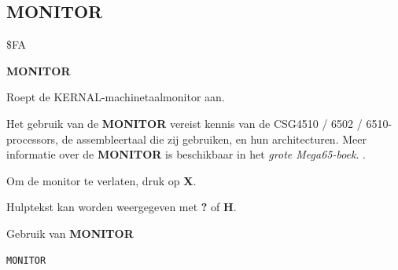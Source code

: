 \subsection{MONITOR}
\begin{description}[leftmargin=2cm,style=nextline]
\item [Token:]    \$FA

\item [Formaat:]   {\bf MONITOR}

\item [Gebruik:]    Roept de KERNAL-machinetaalmonitor aan.

\item [Opmerkingen:]  Het gebruik van de {\bf MONITOR} vereist kennis van de CSG4510 / 6502 / 6510-processors, de assembleertaal die zij gebruiken, en hun architecturen. Meer informatie over de {\bf MONITOR} is beschikbaar in \ifdefined\printmanual                     het {\em grote Mega65-boek}.
                  \else
                     .
                  \fi

                  Om de monitor te verlaten, druk op {\bf X}.

                  Hulptekst kan worden weergegeven met {\bf ?} of {\bf H}.

\item [Voorbeeld:]  Gebruik van {\bf MONITOR}

\begin{tcolorbox}[colback=black,coltext=white]
\verbatimfont{\codefont}
\begin{verbatim}
MONITOR
\end{verbatim}
\end{tcolorbox}

\end{description}


\newpage
